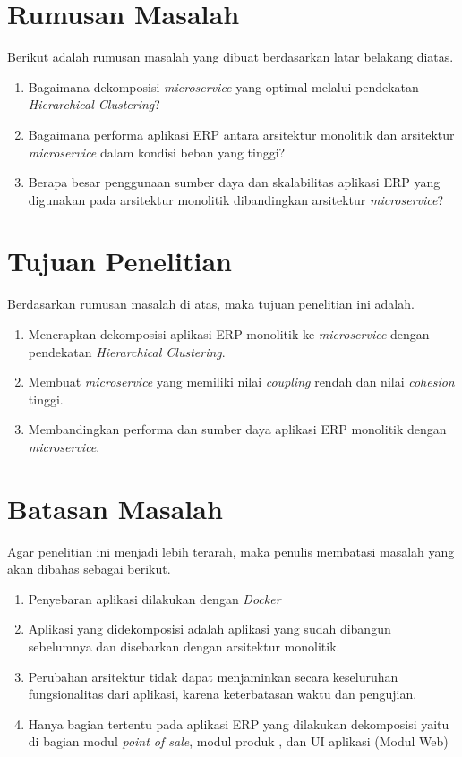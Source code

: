 \hfill \break

\section{Rumusan Masalah}
Berikut adalah rumusan masalah yang dibuat berdasarkan latar belakang diatas.
\begin{enumerate}[nolistsep,leftmargin=0.5cm]
  \item Bagaimana dekomposisi \textit{microservice} yang optimal melalui pendekatan \textit{Hierarchical Clustering}?
  \item Bagaimana performa aplikasi ERP antara arsitektur monolitik dan arsitektur \textit{microservice} dalam kondisi beban yang tinggi?
  \item Berapa besar penggunaan sumber daya dan skalabilitas aplikasi ERP yang digunakan pada arsitektur monolitik dibandingkan arsitektur \textit{microservice}?\\
\end{enumerate}

\section{Tujuan Penelitian}
Berdasarkan rumusan masalah di atas, maka tujuan penelitian ini adalah.
\begin{enumerate}[nolistsep,leftmargin=0.5cm]
  \item Menerapkan dekomposisi aplikasi ERP monolitik ke \textit{microservice} dengan pendekatan \textit{Hierarchical Clustering}.
  \item Membuat \textit{microservice} yang memiliki nilai \textit{coupling} rendah dan nilai \textit{cohesion} tinggi.
  \item Membandingkan performa dan sumber daya aplikasi ERP monolitik dengan \textit{microservice}. \\
\end{enumerate}

\section{Batasan Masalah}
Agar penelitian ini menjadi lebih terarah, maka penulis membatasi masalah yang akan dibahas sebagai berikut.
\begin{enumerate}[nolistsep,leftmargin=0.5cm]
  \item Penyebaran aplikasi dilakukan dengan \textit{Docker}
  \item Aplikasi yang didekomposisi adalah aplikasi yang sudah dibangun sebelumnya dan disebarkan dengan arsitektur monolitik.
  \item Perubahan arsitektur tidak dapat menjaminkan secara keseluruhan fungsionalitas dari aplikasi, karena keterbatasan waktu dan pengujian.
  \item Hanya bagian tertentu pada aplikasi ERP yang dilakukan dekomposisi yaitu di bagian modul \textit{point of sale}, modul produk , dan UI aplikasi (Modul Web) \\
\end{enumerate}

